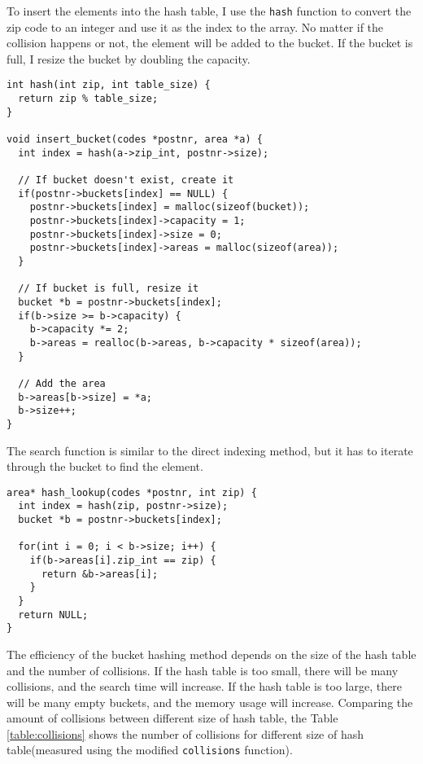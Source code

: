 \documentclass[a4paper,11pt]{article}
\begin{document}
To insert the elements into the hash table, I use the {\tt hash} function to convert the zip code to an integer
and use it as the index to the array. No matter if the collision happens or not, the element will be added to the bucket.
If the bucket is full, I resize the bucket by doubling the capacity.

\begin{verbatim}
int hash(int zip, int table_size) {
  return zip % table_size;
}

void insert_bucket(codes *postnr, area *a) {
  int index = hash(a->zip_int, postnr->size);
  
  // If bucket doesn't exist, create it
  if(postnr->buckets[index] == NULL) {
    postnr->buckets[index] = malloc(sizeof(bucket));
    postnr->buckets[index]->capacity = 1;
    postnr->buckets[index]->size = 0;
    postnr->buckets[index]->areas = malloc(sizeof(area));
  }
  
  // If bucket is full, resize it
  bucket *b = postnr->buckets[index];
  if(b->size >= b->capacity) {
    b->capacity *= 2;
    b->areas = realloc(b->areas, b->capacity * sizeof(area));
  }
  
  // Add the area
  b->areas[b->size] = *a;
  b->size++;
}
\end{verbatim}

The search function is similar to the direct indexing method, 
but it has to iterate through the bucket to find the element.

\begin{verbatim}
area* hash_lookup(codes *postnr, int zip) {
  int index = hash(zip, postnr->size);
  bucket *b = postnr->buckets[index];
  
  for(int i = 0; i < b->size; i++) {
    if(b->areas[i].zip_int == zip) {
      return &b->areas[i];
    }
  }
  return NULL;
}
\end{verbatim}

The efficiency of the bucket hashing method depends on the size of the hash table and the number of collisions.
If the hash table is too small, there will be many collisions, and the search time will increase.
If the hash table is too large, there will be many empty buckets, and the memory usage will increase.
Comparing the amount of collisions between different size of hash table, the Table \ref{table:collisions} shows 
the number of collisions for different size of hash table(measured using the modified {\tt collisions} function).
\end{document}
